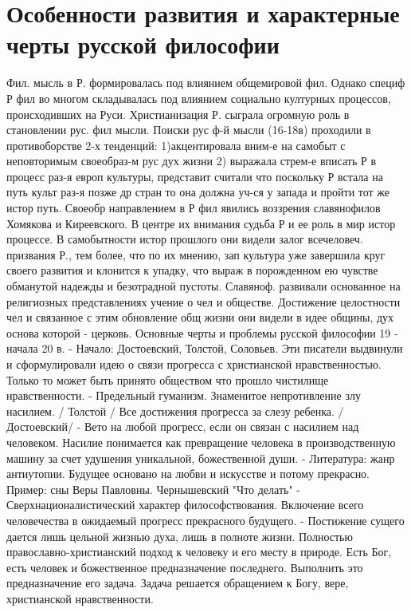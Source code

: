 \documentclass[12pt]{article}
\begin{document}
\section{Особенности развития и характерные черты русской философии}
Фил. мысль в Р. формировалась под влиянием общемировой фил. Однако специф Р фил во многом складывалась
под влиянием социально културных процессов, происходивших на Руси. Христианизация Р. сыграла огромную
роль  в  становлении  рус.  фил  мысли.  Поиски  рус  ф-й  мысли  (16-18в)  проходили  в  противоборстве  2-х
тенденций: 1)акцентировала вним-е на самобыт с неповторимым своеобраз-м рус дух жизни 2) выражала стрем-е вписать Р в процесс раз-я европ культуры, представит считали что поскольку Р встала на путь культ раз-я
позже др стран то она должна уч-ся у запада и пройти тот же истор путь. Своеобр направлением в Р фил
явились воззрения славянофилов Хомякова и Киреевского.  В центре их внимания судьба Р и ее роль в мир
истор процессе. В самобытности истор прошлого они видели залог всечеловеч. призвания Р., тем более, что по
их мнению, зап культура уже завершила круг своего развития и клонится к упадку, что выраж в порожденном
ею  чувстве  обманутой  надежды  и  безотрадной  пустоты.  Славяноф.  развивали  основанное  на  религиозных
представлениях учение о чел и обществе. Достижение  целостности чел и связанное с этим обновление общ
жизни они видели в идее общины, дух основа которой - церковь. 
Основные черты и проблемы русской философии 19 - начала 20 в.
- Начало: Достоевский, Толстой, Соловьев.
Эти писатели выдвинули и сформулировали идею о связи прогресса с христианской нравственностью. Только
то может быть принято обществом что прошло чистилище нравственности.
- Предельный гуманизм.
Знаменитое непротивление злу насилием. / Толстой /
Все достижения прогресса за слезу ребенка. / Достоевский/ 
- Вето на любой прогресс, если он связан с насилием над человеком.
Насилие понимается как превращение человека в производственную машину за счет удушения уникальной,
божественной души.
- Литература: жанр антиутопии.
Будущее основано на любви и искусстве и потому прекрасно. Пример: сны Веры Павловны. Чернышевский
"Что делать"
- Сверхнационалистический характер философствования. 
Включение всего человечества в ожидаемый прогресс прекрасного будущего.
- Постижение сущего дается лишь цельной жизнью духа, лишь в полноте жизни.
Полностью православно-христианский подход к человеку и его месту в природе. Есть Бог, есть человек и
божественное  предназначение  последнего.  Выполнить  это  предназначение  его  задача.  Задача  решается
обращением к Богу, вере, христианской нравственности.
\end{document}
